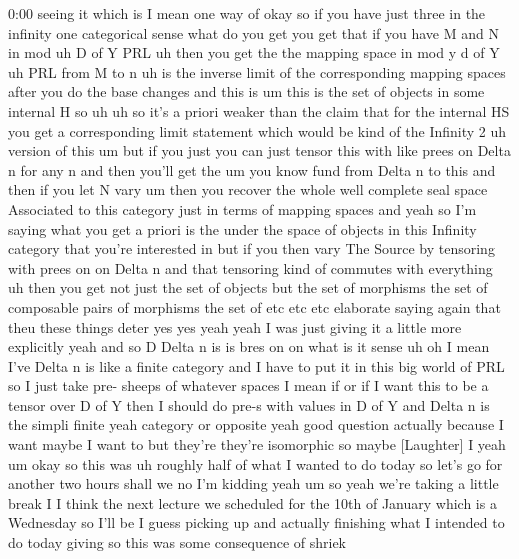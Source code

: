 \begin{unfinished}{0:00}
seeing  it  which  is  I  mean  one  way  of
okay  so  if  you  have  just  three  in  the
infinity  one  categorical  sense  what  do
you  get  you  get  that  if  you  have  M  and  N
in
mod  uh  D  of  Y
PRL  uh  then  you  get  the  the  mapping
space  in  mod  y  d  of  Y  uh  PRL  from  M  to  n
uh  is  the  inverse  limit  of  the
corresponding  mapping  spaces  after  you
do  the  base  changes  and  this  is  um
this  is  the  set  of  objects  in  some
internal  H
so
uh
uh  so  it's  a  priori  weaker  than  the
claim  that  for  the  internal  HS  you  get  a
corresponding  limit  statement  which
would  be  kind  of  the  Infinity  2  uh
version  of  this  um  but  if  you  just  you
can  just  tensor  this  with  like  prees  on
Delta  n  for  any  n  and  then  you'll  get
the  um  you  know
fund  from  Delta  n  to  this  and  then  if
you  let  N  vary  um  then  you  recover  the
whole  well  complete  seal  space
Associated  to  this  category  just  in
terms  of  mapping  spaces
and  yeah  so  I'm  saying  what  you  get  a
priori  is  the  under  the  space  of  objects
in  this  Infinity  category  that  you're
interested  in  but  if  you  then  vary  The
Source  by  tensoring  with  prees
on  on  Delta  n  and  that  tensoring  kind  of
commutes  with  everything  uh  then  you  get
not  just  the  set  of  objects  but  the  set
of  morphisms  the  set  of  composable  pairs
of  morphisms  the  set  of  etc  etc
etc  elaborate  saying  again  that  theu
these  things
deter  yes
yes  yeah  yeah  I  was  just  giving  it  a
little  more
explicitly  yeah  and  so  D  Delta  n  is  is
bres  on
on  what  is
it
sense  uh  oh  I  mean  I've  Delta  n  is  like
a  finite  category  and  I  have  to  put  it
in  this  big  world  of  PRL  so  I  just  take
pre-  sheeps  of  whatever  spaces  I  mean  if
or  if  I  want  this  to  be  a  tensor  over  D
of  Y  then  I  should  do  pre-s  with  values
in  D  of
Y  and  Delta  n  is  the  simpli
finite  yeah  category  or  opposite
yeah  good  question  actually  because  I
want  maybe  I  want  to  but  they're  they're
isomorphic  so  maybe
[Laughter]
I
yeah
um
okay  so  this  was  uh  roughly  half  of  what
I  wanted  to  do  today  so  let's  go  for
another  two  hours  shall  we  no  I'm
kidding  yeah  um  so  yeah  we're  taking  a
little  break  I  I  think  the  next  lecture
we  scheduled  for  the  10th  of  January
which  is  a  Wednesday  so  I'll  be  I  guess
picking  up  and  actually  finishing  what  I
intended  to  do  today  giving  so  this  was
some  consequence  of  shriek

\end{unfinished}
